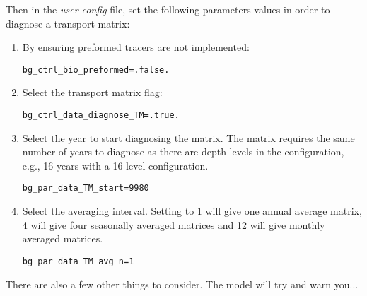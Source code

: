Then in the \textit{user-config} file, set the following parameters values in order to diagnose a transport matrix:

\begin{enumerate}
\vspace{1mm}
\item By ensuring preformed tracers are not implemented:
\vspace{-1mm}\small\begin{verbatim}
bg_ctrl_bio_preformed=.false.
\end{verbatim}\normalsize\vspace{-1mm}
\vspace{1mm}
\item Select the transport matrix flag:
\vspace{-1mm}\small\begin{verbatim}
bg_ctrl_data_diagnose_TM=.true.
\end{verbatim}\normalsize\vspace{-1mm}
\vspace{1mm}
\item Select the year to start diagnosing the matrix. The matrix requires the same number of years to diagnose as there are depth levels in the configuration, e.g., 16 years with a 16-level configuration.
\vspace{-1mm}\small\begin{verbatim}
bg_par_data_TM_start=9980
\end{verbatim}\normalsize\vspace{-1mm}
\vspace{1mm}
\item Select the averaging interval. Setting to 1 will give one annual average matrix, 4 will give four seasonally averaged matrices and 12 will give monthly averaged matrices.
\vspace{-1mm}\small\begin{verbatim}
bg_par_data_TM_avg_n=1
\end{verbatim}\normalsize\vspace{-1mm}
\end{enumerate}
\vspace{2mm}

\noindent There are also a few other things to consider. The model will try and warn you...

